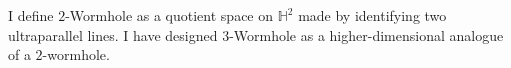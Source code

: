 

I define $2$-Wormhole as a quotient space on $\mathbb{H}^2$ made by identifying two ultraparallel lines. I have designed $3$-Wormhole as a higher-dimensional analogue of a $2$-wormhole. %


